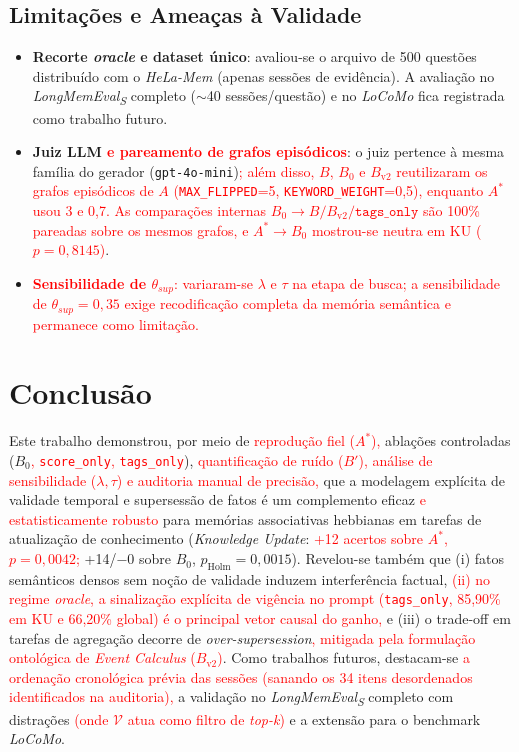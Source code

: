 \documentclass[10pt,conference,twocolumn]{IEEEtran}
\newcommand{\novo}[1]{\textcolor{red}{#1}}
\begin{document}
\subsection{Limitações e Ameaças à Validade}
\begin{itemize}
    \item \textbf{Recorte \textit{oracle} e dataset único}: avaliou-se o arquivo de 500 questões distribuído com o \textit{HeLa-Mem} (apenas sessões de evidência). A avaliação no \textit{LongMemEval\textsubscript{S}} completo ($\sim$40 sessões/questão) e no \textit{LoCoMo} fica registrada como trabalho futuro.
    \item \textbf{Juiz LLM \novo{e pareamento de grafos episódicos}}: o juiz pertence à mesma família do gerador (\texttt{gpt-4o-mini})\novo{; além disso, $B$, $B_0$ e $B_{\text{v2}}$ reutilizaram os grafos episódicos de $A$ (\texttt{MAX\_FLIPPED}=5, \texttt{KEYWORD\_WEIGHT}=0,5), enquanto $A^*$ usou 3 e 0,7. As comparações internas $B_0 \rightarrow B / B_{\text{v2}} / \texttt{tags\_only}$ são 100\% pareadas sobre os mesmos grafos, e $A^* \rightarrow B_0$ mostrou-se neutra em KU ($p = 0{,}8145$)}.
    \item \novo{\textbf{Sensibilidade de $\theta_{sup}$}: variaram-se $\lambda$ e $\tau$ na etapa de busca; a sensibilidade de $\theta_{sup}=0{,}35$ exige recodificação completa da memória semântica e permanece como limitação.}
\end{itemize}

\section{Conclusão}
Este trabalho demonstrou, por meio de \novo{reprodução fiel ($A^*$),} ablações controladas ($B_0$\novo{, \texttt{score\_only}, \texttt{tags\_only}}), \novo{quantificação de ruído ($B'$), análise de sensibilidade ($\lambda, \tau$) e auditoria manual de precisão,} que a modelagem explícita de validade temporal e supersessão de fatos é um complemento eficaz \novo{e estatisticamente robusto} para memórias associativas hebbianas em tarefas de atualização de conhecimento (\textit{Knowledge Update}: \novo{+12 acertos sobre $A^*$, $p = 0{,}0042$;} +14/$-$0 sobre $B_0$, $p_{\text{Holm}} = 0{,}0015$). Revelou-se também que (i) fatos semânticos densos sem noção de validade induzem interferência factual, \novo{(ii) no regime \textit{oracle}, a sinalização explícita de vigência no prompt (\texttt{tags\_only}, 85,90\% em KU e 66,20\% global) é o principal vetor causal do ganho,} e (iii) o trade-off em tarefas de agregação decorre de \textit{over-supersession}\novo{, mitigada pela formulação ontológica de \textit{Event Calculus} ($B_{\text{v2}}$)}. Como trabalhos futuros, destacam-se \novo{a ordenação cronológica prévia das sessões (sanando os 34 itens desordenados identificados na auditoria),} a validação no \textit{LongMemEval\textsubscript{S}} completo com distrações \novo{(onde $\mathcal{V}$ atua como filtro de \textit{top-k})} e a extensão para o benchmark \textit{LoCoMo}.
\end{document}
